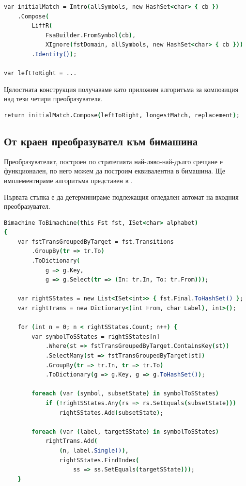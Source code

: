 \documentclass[12pt, oneside]{article}
\theoremstyle{definition}
\begin{document}
\begin{lstlisting}[language=csh,firstnumber=1]
var initialMatch = Intro(allSymbols, new HashSet<char> { cb })
    .Compose(
        LiffR(
            FsaBuilder.FromSymbol(cb),
            XIgnore(fstDomain, allSymbols, new HashSet<char> { cb }))
        .Identity());

var leftToRight = ...
\end{lstlisting}

Цялостната конструкция получаваме като приложим алгоритъма за композиция над тези четири преобразувателя.

\begin{lstlisting}[language=csh,firstnumber=9]
	return initialMatch.Compose(leftToRight, longestMatch, replacement);
\end{lstlisting}

\subsection{От краен преобразувател към бимашина}

Преобразувателят, построен по стратегията най-ляво-най-дълго срещане е функционален, по него можем да построим еквивалентна в бимашина. Ще имплементираме алгоритъма представен в \cite{GerdjikovEtAl:2017}.

Първата стъпка е да детерминираме подлежащия огледален автомат на входния преобразувател.

\begin{lstlisting}[language=csh,firstnumber=1]
Bimachine ToBimachine(this Fst fst, ISet<char> alphabet)
{
    var fstTransGroupedByTarget = fst.Transitions
        .GroupBy(tr => tr.To)
        .ToDictionary(
            g => g.Key, 
            g => g.Select(tr => (In: tr.In, To: tr.From)));

    var rightSStates = new List<ISet<int>> { fst.Final.ToHashSet() };
    var rightTrans = new Dictionary<(int From, char Label), int>();

    for (int n = 0; n < rightSStates.Count; n++) {
        var symbolToSStates = rightSStates[n]
            .Where(st => fstTransGroupedByTarget.ContainsKey(st))
            .SelectMany(st => fstTransGroupedByTarget[st])
            .GroupBy(tr => tr.In, tr => tr.To)
            .ToDictionary(g => g.Key, g => g.ToHashSet());

        foreach (var (symbol, subsetState) in symbolToSStates)
            if (!rightSStates.Any(rs => rs.SetEquals(subsetState)))
                rightSStates.Add(subsetState);
        
        foreach (var (label, targetSState) in symbolToSStates)
            rightTrans.Add(
                (n, label.Single()),
                rightSStates.FindIndex(
                    ss => ss.SetEquals(targetSState)));
	}
\end{lstlisting}
\end{document}
